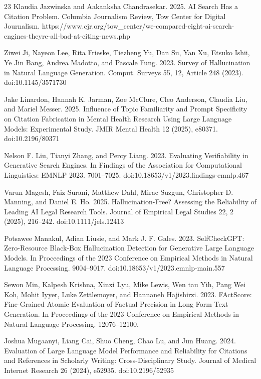 \begin{thebibliography}{23}
 Klaudia Jazwinska and Aakanksha Chandrasekar. 2025. AI Search Has a Citation Problem. Columbia Journalism Review, Tow Center for Digital Journalism. https://www.cjr.org/tow\_center/we-compared-eight-ai-search-engines-theyre-all-bad-at-citing-news.php

 Ziwei Ji, Nayeon Lee, Rita Frieske, Tiezheng Yu, Dan Su, Yan Xu, Etsuko Ishii, Ye Jin Bang, Andrea Madotto, and Pascale Fung. 2023. Survey of Hallucination in Natural Language Generation. Comput. Surveys 55, 12, Article 248 (2023). doi:10.1145/3571730

 Jake Linardon, Hannah K. Jarman, Zoe McClure, Cleo Anderson, Claudia Liu, and Mariel Messer. 2025. Influence of Topic Familiarity and Prompt Specificity on Citation Fabrication in Mental Health Research Using Large Language Models: Experimental Study. JMIR Mental Health 12 (2025), e80371. doi:10.2196/80371

 Nelson F. Liu, Tianyi Zhang, and Percy Liang. 2023. Evaluating Verifiability in Generative Search Engines. In Findings of the Association for Computational Linguistics: EMNLP 2023. 7001–7025. doi:10.18653/v1/2023.findings-emnlp.467

 Varun Magesh, Faiz Surani, Matthew Dahl, Mirac Suzgun, Christopher D. Manning, and Daniel E. Ho. 2025. Hallucination-Free? Assessing the Reliability of Leading AI Legal Research Tools. Journal of Empirical Legal Studies 22, 2 (2025), 216–242. doi:10.1111/jels.12413

 Potsawee Manakul, Adian Liusie, and Mark J. F. Gales. 2023. SelfCheckGPT: Zero-Resource Black-Box Hallucination Detection for Generative Large Language Models. In Proceedings of the 2023 Conference on Empirical Methods in Natural Language Processing. 9004–9017. doi:10.18653/v1/2023.emnlp-main.557

 Sewon Min, Kalpesh Krishna, Xinxi Lyu, Mike Lewis, Wen tau Yih, Pang Wei Koh, Mohit Iyyer, Luke Zettlemoyer, and Hannaneh Hajishirzi. 2023. FActScore: Fine-Grained Atomic Evaluation of Factual Precision in Long Form Text Generation. In Proceedings of the 2023 Conference on Empirical Methods in Natural Language Processing. 12076–12100.

 Joshua Mugaanyi, Liang Cai, Shuo Cheng, Chao Lu, and Jun Huang. 2024. Evaluation of Large Language Model Performance and Reliability for Citations and References in Scholarly Writing: Cross-Disciplinary Study. Journal of Medical Internet Research 26 (2024), e52935. doi:10.2196/52935


\end{thebibliography}

